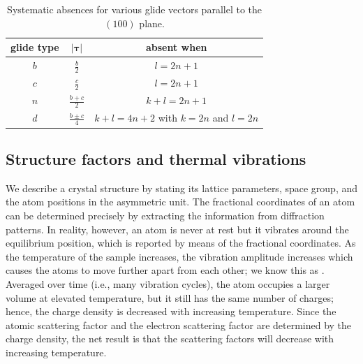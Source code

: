\begin{table}[h!]
\centering\leavevmode
\begin{tabular}{|c|c|c|}
\hline
glide type& $\vert\bm{\tau}\vert$ & absent when \\
\hline\hline
$b$ & $\frac{b}{2}$ & $l=2n+1$ \\[3pt]
$c$ & $\frac{c}{2}$ & $l=2n+1$ \\[3pt]
$n$ & $\frac{b+c}{2}$ & $k+l=2n+1$ \\[3pt]
$d$ & $\frac{b\pm c}{4}$ & $k+l=4n+2$ with $k=2n$ and $l=2n$ \\
\hline
\end{tabular}
\caption{\label{\chabbr:tb:SFglides}Systematic absences for various glide vectors parallel to the $(100)$ plane.}
\end{table}


\subsection{Structure factors and thermal vibrations}\label{\chabbr:ssec:SFvibrations}
We describe a crystal structure by stating its lattice parameters, space group, and the atom positions in the asymmetric unit. The fractional coordinates of an atom can be determined precisely by extracting the information from diffraction patterns.  In reality, however, an atom is never at rest but it vibrates around the equilibrium position, which is reported by means of the fractional coordinates.  As the temperature of the sample increases, the vibration amplitude increases which causes the atoms to move further apart from each other; we know this as .  Averaged over time (i.e., many vibration cycles), the atom occupies a larger volume at elevated temperature, but it still has the same number of charges; hence, the charge density is decreased with increasing temperature. Since the atomic scattering factor and the electron scattering factor are determined by the charge density, the net result is that the scattering factors will decrease with increasing temperature.

